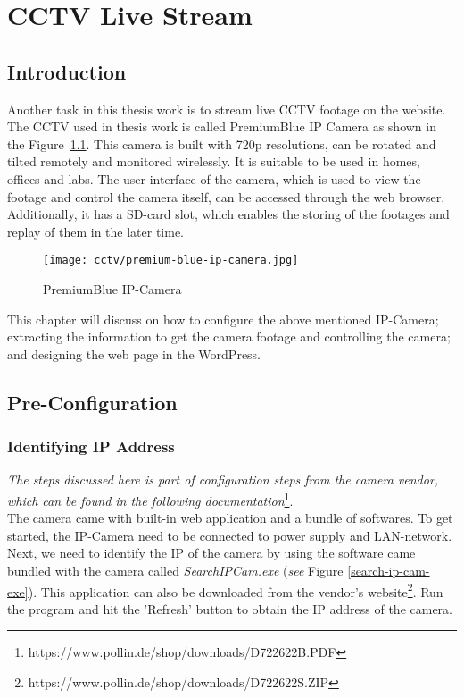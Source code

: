 \chapter{CCTV Live Stream}

\section{Introduction}
Another task in this thesis work is to stream live CCTV footage on the website. The CCTV used in thesis work is called PremiumBlue IP Camera as shown in the Figure~\ref{fig:premium-blue-ip-camera}. This camera is built with 720p resolutions, can be rotated and tilted remotely and monitored wirelessly. It is suitable to be used in homes, offices and labs. The user interface of the camera, which is used to view the footage and control the camera itself, can be accessed through the web browser. Additionally, it has a SD-card slot, which enables the storing of the footages and replay of them in the later time.

\begin{figure}[ht]
\caption{PremiumBlue IP-Camera}
\label{fig:premium-blue-ip-camera}
\centering
\texttt{[image: cctv/premium-blue-ip-camera.jpg]}
\end{figure}

This chapter will discuss on how to configure the above mentioned IP-Camera; extracting the information to get the camera footage and controlling the camera; and designing the web page in the WordPress.

\section{Pre-Configuration}
\subsection{Identifying IP Address}\label{sec:cctv-identifying-ip-address}
\emph{The steps discussed here is part of configuration steps from the camera vendor, which can be found in the following documentation}\footnote{https://www.pollin.de/shop/downloads/D722622B.PDF}.\\

The camera came with built-in web application and a bundle of softwares. To get started, the IP-Camera need to be connected to power supply and LAN-network. Next, we need to identify the IP of the camera by using the software came bundled with the camera called \emph{SearchIPCam.exe} (\emph{see} Figure \ref{search-ip-cam-exe}). This application can also be downloaded from the vendor's website\footnote{https://www.pollin.de/shop/downloads/D722622S.ZIP}. Run the program and hit the 'Refresh' button to obtain the IP address of the camera.

